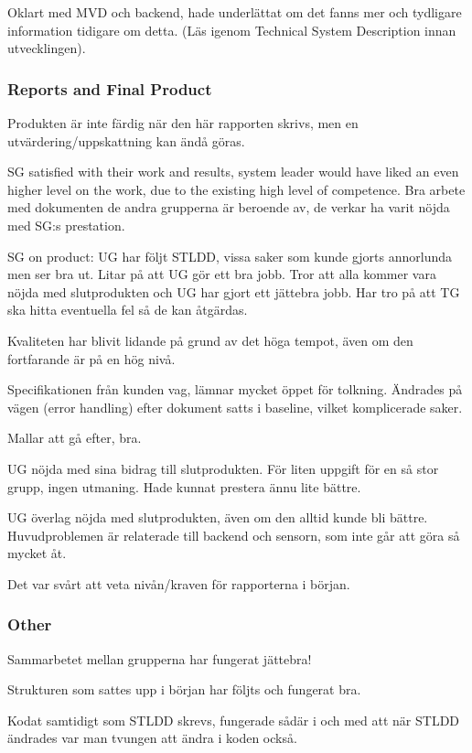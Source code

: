 \documentclass[a4paper]{article}
\begin{document}
Oklart med MVD och backend, hade underlättat om det fanns mer och tydligare information tidigare om detta. (Läs igenom Technical System Description innan utvecklingen).


\subsubsection{Reports and Final Product}
Produkten är inte färdig när den här rapporten skrivs, men en utvärdering/uppskattning kan ändå göras.

SG satisfied with their work and results, system leader would have liked an even higher level on the work, due to the existing high level of competence. Bra arbete med dokumenten de andra grupperna är beroende av, de verkar ha varit nöjda med SG:s prestation.

SG on product: UG har följt STLDD, vissa saker som kunde gjorts annorlunda men ser bra ut. Litar på att UG gör ett bra jobb. Tror att alla kommer vara nöjda med slutprodukten och UG har gjort ett jättebra jobb. Har tro på att TG ska hitta eventuella fel så de kan åtgärdas. 

Kvaliteten har blivit lidande på grund av det höga tempot, även om den fortfarande är på en hög nivå.

Specifikationen från kunden vag, lämnar mycket öppet för tolkning. Ändrades på vägen (error handling) efter dokument satts i baseline, vilket komplicerade saker.

Mallar att gå efter, bra.

UG nöjda med sina bidrag till slutprodukten. För liten uppgift för en så stor grupp, ingen utmaning. Hade kunnat prestera ännu lite bättre.

UG överlag nöjda med slutprodukten, även om den alltid kunde bli bättre. Huvudproblemen är relaterade till backend och sensorn, som inte går att göra så mycket åt.

Det var svårt att veta nivån/kraven för rapporterna i början.

\subsubsection{Other}
Sammarbetet mellan grupperna har fungerat jättebra!

Strukturen som sattes upp i början har följts och fungerat bra.

Kodat samtidigt som STLDD skrevs, fungerade sådär i och med att när STLDD ändrades var man tvungen att ändra i koden också.
\end{document}
